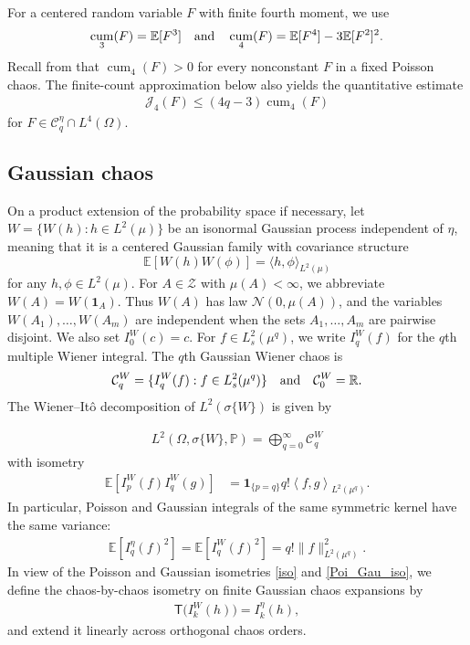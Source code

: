 \documentclass[letterpaper,11pt,reqno]{amsart}
\numberwithin{equation}{section}
\theoremstyle{plain}
\theoremstyle{definition}
\theoremstyle{remark}
\newcommand{\E}{\mathbb{E}}
\newcommand{\PP}{\mathbb{P}}
\newcommand{\R}{\mathbb{R}}
\newcommand{\NN}{\mathcal{N}}
\newcommand{\ind}{\mathbf{1}}
\newcommand{\cC}{\mathcal{C}}
\newcommand{\sZ}{\mathscr{Z}}
\DeclareMathOperator{\cum}{cum}
\newcommand{\noi}{\noindent}
\newcommand{\Jfour}{\mathcal J_4}
\newcommand{\s}{\sigma}
\newcommand{\inner}[2]{\left\langle #1,#2\right\rangle}
\newcommand{\AND}{\quad{\rm and}\quad}
\begin{document}
For a centered random variable $F$ with finite fourth moment, we use
\noi
\begin{align*}
 \cum_3(F)=\E[F^3]
 \AND
 \cum_4(F)=\E[F^4]-3\E[F^2]^2.
\end{align*}
Recall from \cite[Remark~3.1.6]{Zhe18} that
$\cum_4(F)>0$ for every nonconstant $F$ in a fixed Poisson chaos.
The finite-count approximation below
also yields the quantitative estimate
\noi
\begin{align}
 \Jfour(F)
 \leq(4q-3)\cum_4(F)
 \label{D4_prelim}
\end{align}
for $F\in\cC_q^\eta\cap L^4(\Omega)$.


\subsection{Gaussian chaos}
\label{SEC_gauss_prelim}

On a product extension of the probability space if necessary, let
$W=\{W(h):h\in L^2(\mu)\}$ be an isonormal Gaussian process
independent of $\eta$, meaning that it is a centered Gaussian family
with
covariance structure
\[
\E[W(h) W(\phi)] = \langle h, \phi\rangle_{L^2(\mu)}
\]
for any $h, \phi\in L^2(\mu)$.
For $A\in\sZ$ with $\mu(A)<\infty$, we abbreviate
$W(A)=W(\ind_A)$.  Thus $W(A)$ has law $\NN(0,\mu(A))$,
and the variables $W(A_1),\ldots,W(A_m)$ are independent
when the sets $A_1,\ldots,A_m$ are pairwise disjoint.
We also set $I_0^W(c)=c$.
For $f\in L_s^2(\mu^q)$, we write $I_q^W(f)$ for the $q$th
multiple Wiener integral.  The $q$th Gaussian Wiener chaos is
\noi
\begin{align*}
 \cC_q^W=\{I_q^W(f):f\in L_s^2(\mu^q)\}
 \AND
 \cC_0^W=\R.
\end{align*}
The Wiener--It\^o decomposition of $L^2(\s\{W\})$ is
given by

\noi
\begin{align*}
 L^2(\Omega, \s\{W\}, \PP) =\bigoplus_{q=0}^{\infty}\cC_q^W
\end{align*}
with isometry
\noi
\begin{align}
 \E[I_p^W(f)I_q^W(g)]
 &=\ind_{\{p=q\}}q!\inner{f}{g}_{L^2(\mu^q)}.
 \label{Poi_Gau_iso}
\end{align}
In particular, Poisson and Gaussian integrals of the same symmetric kernel
have the same variance:
\noi
\begin{align*}
 \E[I_q^\eta(f)^2]
 =\E[I_q^W(f)^2]
 =q!\|f\|_{L^2(\mu^q)}^2.
\end{align*}
In view of the Poisson and Gaussian isometries \eqref{iso} and
\eqref{Poi_Gau_iso}, we define the chaos-by-chaos isometry on finite
Gaussian chaos expansions by
\noi
\begin{align}
 \mathsf T\bigl(I_k^W(h)\bigr)=I_k^\eta(h),
 \label{chaos_transport}
\end{align}
and extend it linearly across orthogonal chaos orders.
\end{document}
